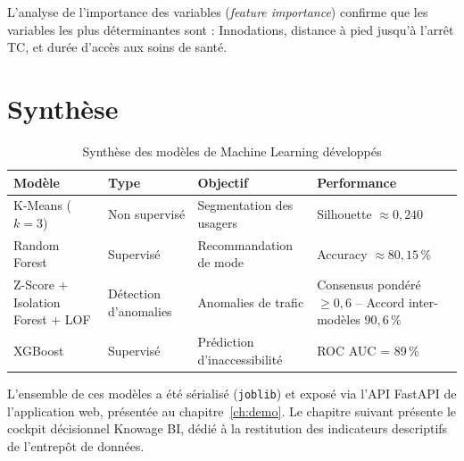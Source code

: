 L'analyse de l'importance des variables (\emph{feature importance}) confirme que les variables les plus déterminantes sont : Innodations, distance à pied jusqu'à l'arrêt TC, et durée d'accès aux soins de santé.

\section{Synthèse}
\begin{table}[H]
\centering
\caption{Synthèse des modèles de Machine Learning développés}
\begin{tabular}{p{3cm}p{2.8cm}p{4cm}p{3.2cm}}
\toprule
\textbf{Modèle} & \textbf{Type} & \textbf{Objectif} & \textbf{Performance} \\
\midrule
K-Means ($k=3$) & Non supervisé & Segmentation des usagers & Silhouette $\approx 0{,}240$ \\
Random Forest & Supervisé & Recommandation de mode & Accuracy $\approx 80{,}15\,\%$ \\
Z-Score + Isolation Forest + LOF & Détection d'anomalies & Anomalies de trafic & Consensus pond\'er\'e $\geq 0{,}6$ -- Accord inter-mod\`eles $90{,}6\,\%$ \\
XGBoost & Supervisé & Prédiction d'inaccessibilité & ROC AUC = 89\,\% \\
\bottomrule
\end{tabular}
\end{table}

L'ensemble de ces modèles a été sérialisé (\texttt{joblib}) et exposé via l'API FastAPI de l'application web, présentée au chapitre~\ref{ch:demo}. Le chapitre suivant présente le cockpit décisionnel Knowage BI, dédié à la restitution des indicateurs descriptifs de l'entrepôt de données.
